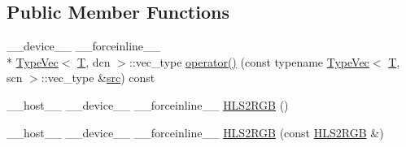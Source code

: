 \subsection*{Public Member Functions}
\begin{DoxyCompactItemize}
\item 
\-\_\-\-\_\-device\-\_\-\-\_\- \-\_\-\-\_\-forceinline\-\_\-\-\_\- \\*
\hyperlink{structcv_1_1gpu_1_1device_1_1TypeVec}{Type\-Vec}$<$ \hyperlink{calib3d_8hpp_a3efb9551a871ddd0463079a808916717}{T}, dcn $>$\-::vec\-\_\-type \hyperlink{structcv_1_1gpu_1_1device_1_1color__detail_1_1HLS2RGB_a49e44f369f569573f56bb87929112faf}{operator()} (const typename \hyperlink{structcv_1_1gpu_1_1device_1_1TypeVec}{Type\-Vec}$<$ \hyperlink{calib3d_8hpp_a3efb9551a871ddd0463079a808916717}{T}, scn $>$\-::vec\-\_\-type \&\hyperlink{legacy_8hpp_a371cd109b74033bc4366f584edd3dacc}{src}) const 
\item 
\-\_\-\-\_\-host\-\_\-\-\_\- \-\_\-\-\_\-device\-\_\-\-\_\- \-\_\-\-\_\-forceinline\-\_\-\-\_\- \hyperlink{structcv_1_1gpu_1_1device_1_1color__detail_1_1HLS2RGB_ac2f150df1c2c81259ea1b976c9c9fe90}{H\-L\-S2\-R\-G\-B} ()
\item 
\-\_\-\-\_\-host\-\_\-\-\_\- \-\_\-\-\_\-device\-\_\-\-\_\- \-\_\-\-\_\-forceinline\-\_\-\-\_\- \hyperlink{structcv_1_1gpu_1_1device_1_1color__detail_1_1HLS2RGB_ad2ee6c43cdf1a6cd16006e56f9e0351b}{H\-L\-S2\-R\-G\-B} (const \hyperlink{structcv_1_1gpu_1_1device_1_1color__detail_1_1HLS2RGB}{H\-L\-S2\-R\-G\-B} \&)
\end{DoxyCompactItemize}


